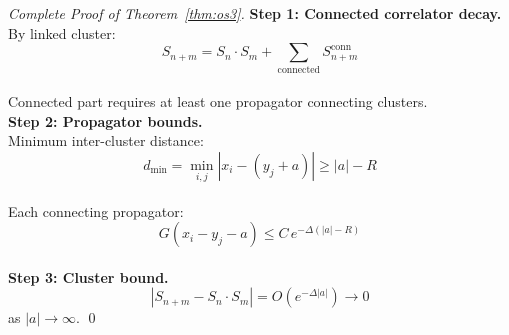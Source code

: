 \documentclass[11pt,a4paper]{article}
\theoremstyle{plain}
\theoremstyle{definition}
\begin{document}
\begin{proof}[Complete Proof of Theorem~\ref{thm:os3}]
\textbf{Step 1: Connected correlator decay.}
\vspace{0.3em}\\
By linked cluster:
\begin{equation}
S_{n+m} = S_n \cdot S_m + \sum_{\text{connected}} S_{n+m}^{\mathrm{conn}}
\end{equation}
\vspace{0.3em}\\
Connected part requires at least one propagator connecting clusters.
\vspace{0.3em}\\
\textbf{Step 2: Propagator bounds.}
\vspace{0.3em}\\
Minimum inter-cluster distance:
\begin{equation}
d_{\min} = \min_{i,j} |x_i - (y_j + a)| \geq |a| - R
\end{equation}
\\
Each connecting propagator:
\begin{equation}
G(x_i - y_j - a) \leq C\, e^{-\Delta(|a| - R)}
\end{equation}
\vspace{0.3em}\\
\textbf{Step 3: Cluster bound.}
\vspace{0.3em}\\
\begin{equation}
|S_{n+m} - S_n \cdot S_m| = O(e^{-\Delta|a|}) \to 0
\end{equation}
as $|a| \to \infty$. \qed
\end{proof}
\vspace{0.3em} 
\end{document}
